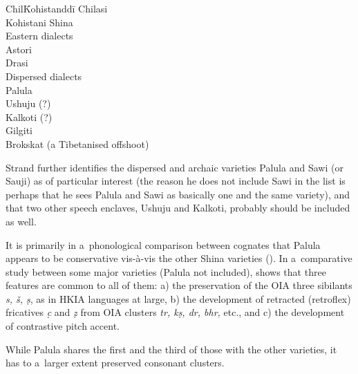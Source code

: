 \begin{enumerate}
\begin{tabbing}
Chil\=Kohistanddi\=\kill
Chilasi \\
\>Kohistani Shina \\
\>Eastern dialects \\
\>\>Astori \\
\>\>Drasi \\
\>Dispersed dialects \\
\>\>Palula \\
\>\>Ushuju (?) \\
\>\>Kalkoti (?) \\
Gilgiti \\
\>Brokskat (a Tibetanised offshoot) \\
\end{tabbing}

\end{enumerate}

Strand further identifies the dispersed and archaic varieties Palula and Sawi (or Sauji) as of particular interest (the reason he does not include Sawi in the list is perhaps that he sees Palula and Sawi as basically one and the same variety), and that two other speech enclaves, Ushuju and Kalkoti, probably should be included as well.


It is primarily in a~phonological comparison between cognates that Palula appears to be conservative vis-à-vis the other Shina varieties (). In a~comparative study between some major varieties (Palula not included), \citet[36]{schmidt2002} shows that three features are common to all of them: a) the preservation of the OIA three sibilants \textit{s, š, ṣ}, as in HKIA languages at large, b) the development of retracted (retroflex) fricatives \textit{c̣} and \textit{ẓ} from OIA clusters \textit{tr, kṣ, dr, bhr,} etc., and c) the development of contrastive pitch accent. 


While Palula shares the first and the third of those with the other varieties, it has to a~larger extent preserved consonant clusters. 


